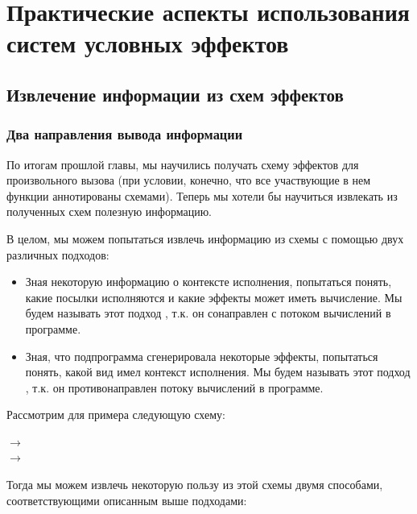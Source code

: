 \section{Практические аспекты использования систем условных эффектов}

\subsection{Извлечение информации из схем эффектов}

\label{section-info-gathering}

\subsubsection{Два направления вывода информации}

По итогам прошлой главы, мы научились получать схему эффектов для произвольного вызова (при условии, конечно, что все участвующие в нем функции аннотированы схемами). Теперь мы хотели бы научиться извлекать из полученных схем полезную информацию.

В целом, мы можем попытаться извлечь информацию из схемы с помощью двух различных подходов:

\begin{itemize}
    \item Зная некоторую информацию о контексте исполнения, попытаться понять, какие посылки исполняются и какие эффекты может иметь вычисление. Мы будем называть этот подход , т.к. он сонаправлен с потоком вычислений в программе.
    
    \item Зная, что подпрограмма сгенерировала некоторые эффекты, попытаться понять, какой вид имел контекст исполнения. Мы будем называть этот подход , т.к. он противонаправлен потоку вычислений в программе.
    
\end{itemize}

Рассмотрим для примера следующую схему:

{
     $\rightarrow$  \\
     $\rightarrow$ 
}{}

Тогда мы можем извлечь некоторую пользу из этой схемы двумя способами, соответствующими описанным выше подходами:

